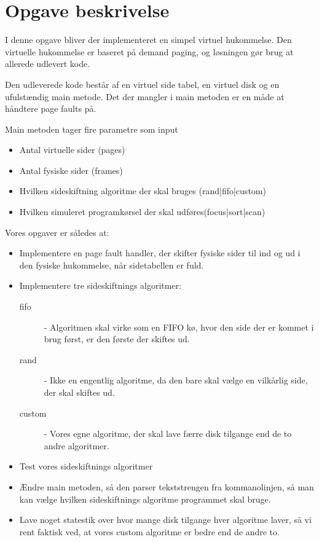 \section{Opgave beskrivelse}

I denne opgave bliver der implementeret en simpel virtuel hukommelse. Den virtuelle hukommelse er baseret på demand paging, og løsningen gør brug at allerede udlevert kode.

Den udleverede kode består af en virtuel side tabel, en virtuel disk og en ufulstændig main metode. Det der mangler i main metoden er en måde at håndtere page faults på.

Main metoden tager fire parametre som input

\begin{itemize}
\item Antal virtuelle sider (pages)
\item Antal fysiske sider (frames)
\item Hvilken sideskiftning algoritme der skal bruges (rand|fifo|custom)
\item Hvilken simuleret programkørsel der skal udføres(focus|sort|scan)
\end{itemize} 

Vores opgaver er således at:

\begin{itemize}
\item Implementere en page fault handler, der skifter fysiske sider til ind og ud i den fysiske hukommelse, når sidetabellen er fuld.

\item Implementere tre sideskiftnings algoritmer: 

\begin{description}
\item[fifo] - Algoritmen skal virke som en FIFO kø, hvor den side der er kommet i brug først, er den første der skiftes ud. 
\item[rand] - Ikke en engentlig algoritme, da den bare skal vælge en vilkårlig side, der skal skiftes ud.
\item[custom] - Vores egne algoritme, der skal lave færre disk tilgange end de to andre algoritmer.
\end{description}

\item Test vores sideskiftnings algoritmer

\item Ændre main metoden, så den parser tekststrengen fra kommanolinjen, så man kan vælge hvilken sideskiftnings algoritme programmet skal bruge.

\item Lave noget statestik over hvor mange disk tilgange hver algoritme laver, så vi rent faktisk ved, at vores custom algoritme er bedre end de andre to.
\end{itemize}